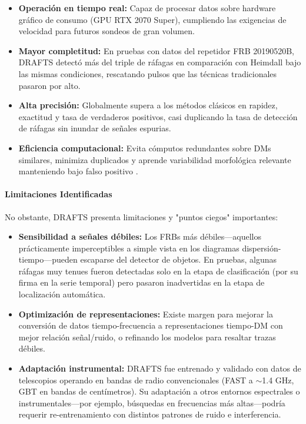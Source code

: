 \begin{itemize}
    \item \textbf{Operación en tiempo real:} Capaz de procesar datos sobre hardware gráfico de consumo (GPU RTX 2070 Super), cumpliendo las exigencias de velocidad para futuros sondeos de gran volumen.
    \item \textbf{Mayor completitud:} En pruebas con datos del repetidor FRB 20190520B, DRAFTS detectó más del triple de ráfagas en comparación con Heimdall bajo las mismas condiciones, rescatando pulsos que las técnicas tradicionales pasaron por alto.
    \item \textbf{Alta precisión:} Globalmente supera a los métodos clásicos en rapidez, exactitud y tasa de verdaderos positivos, casi duplicando la tasa de detección de ráfagas sin inundar de señales espurias.
    \item \textbf{Eficiencia computacional:} Evita cómputos redundantes sobre DMs similares, minimiza duplicados y aprende variabilidad morfológica relevante manteniendo bajo falso positivo \citep{zhang2024drafts,Heimdall_Use}.
\end{itemize}

\paragraph{Limitaciones Identificadas}

No obstante, DRAFTS presenta limitaciones y "puntos ciegos" importantes:

\begin{itemize}
    \item \textbf{Sensibilidad a señales débiles:} Los FRBs más débiles—aquellos prácticamente imperceptibles a simple vista en los diagramas dispersión-tiempo—pueden escaparse del detector de objetos. En pruebas, algunas ráfagas muy tenues fueron detectadas solo en la etapa de clasificación (por su firma en la serie temporal) pero pasaron inadvertidas en la etapa de localización automática.
    \item \textbf{Optimización de representaciones:} Existe margen para mejorar la conversión de datos tiempo-frecuencia a representaciones tiempo-DM con mejor relación señal/ruido, o refinando los modelos para resaltar trazas débiles.
    \item \textbf{Adaptación instrumental:} DRAFTS fue entrenado y validado con datos de telescopios operando en bandas de radio convencionales (FAST a $\sim$1.4 GHz, GBT en bandas de centímetros). Su adaptación a otros entornos espectrales o instrumentales—por ejemplo, búsquedas en frecuencias más altas—podría requerir re-entrenamiento con distintos patrones de ruido e interferencia.
\end{itemize}

